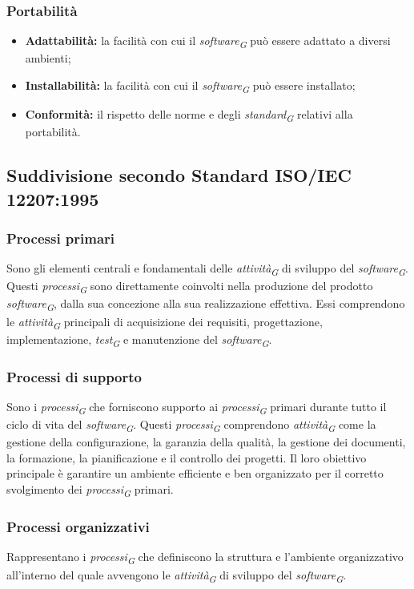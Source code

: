 \subsubsection{Portabilità}
\begin{itemize}
    \item \textbf{Adattabilità:} la facilità con cui il \textit{software}\textsubscript{\textit{G}} può essere adattato a diversi ambienti;
    \item \textbf{Installabilità:} la facilità con cui il \textit{software}\textsubscript{\textit{G}} può essere installato;
    \item \textbf{Conformità:} il rispetto delle norme e degli \textit{standard}\textsubscript{\textit{G}} relativi alla portabilità.
\end{itemize}

\subsection{Suddivisione secondo Standard ISO/IEC 12207:1995}

\subsubsection{Processi primari}
Sono gli elementi centrali e fondamentali delle \textit{attività}\textsubscript{\textit{G}} di sviluppo del \textit{software}\textsubscript{\textit{G}}. Questi \textit{processi}\textsubscript{\textit{G}} sono direttamente coinvolti nella produzione del prodotto \textit{software}\textsubscript{\textit{G}}, dalla sua concezione alla sua realizzazione effettiva. Essi comprendono le \textit{attività}\textsubscript{\textit{G}} principali di acquisizione dei requisiti, progettazione, implementazione, \textit{test}\textsubscript{\textit{G}} e manutenzione del \textit{software}\textsubscript{\textit{G}}.

\subsubsection{Processi di supporto}
Sono i \textit{processi}\textsubscript{\textit{G}} che forniscono supporto ai \textit{processi}\textsubscript{\textit{G}} primari durante tutto il ciclo di vita del \textit{software}\textsubscript{\textit{G}}. Questi \textit{processi}\textsubscript{\textit{G}} comprendono \textit{attività}\textsubscript{\textit{G}} come la gestione della configurazione, la garanzia della qualità, la gestione dei documenti, la formazione, la pianificazione e il controllo dei progetti. Il loro obiettivo principale è garantire un ambiente efficiente e ben organizzato per il corretto svolgimento dei \textit{processi}\textsubscript{\textit{G}} primari.

\subsubsection{Processi organizzativi}
Rappresentano i \textit{processi}\textsubscript{\textit{G}} che definiscono la struttura e l'ambiente organizzativo all'interno del quale avvengono le \textit{attività}\textsubscript{\textit{G}} di sviluppo del \textit{software}\textsubscript{\textit{G}}. 
